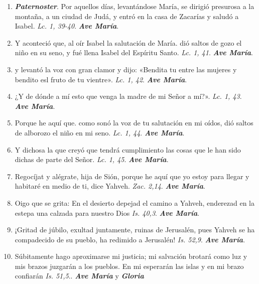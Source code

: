 \documentclass[../../devocionario.tex]{subfiles}
\begin{document}
    \begin{enumerate}
        
        \item \textbf{\textit{Paternoster}}. Por aquellos días, levantándose María, se dirigió presurosa a la montaña, a un ciudad de Judá, 
            y entró en la casa de Zacarías y saludó a Isabel. \textit{Lc. 1, 39-40}. \textbf{\textit{Ave María}}.

        \item Y aconteció que, al oír Isabel la salutación de María. dió saltos de gozo el niño en su seno, 
            y fué llena Isabel del Espíritu Santo. \textit{Lc. 1, 41}. \textbf{\textit{Ave María}}.

        \item y levantó la voz con gran clamor y dijo: «Bendita tu entre las mujeres y bendito esl fruto de tu vientre». \textit{Lc. 1, 42}. \textbf{\textit{Ave María}}.

        \item ¿Y de dónde a mí esto que venga la madre de mi Señor a mí?». \textit{Lc. 1, 43}. \textbf{\textit{Ave María}}.

        \item Porque he aquí que. como sonó la voz de tu salutación en mi oídos, dió saltos de alborozo el niño en mi seno. \textit{Lc. 1, 44}. \textbf{\textit{Ave María}}.

        \item Y dichosa la que creyó que tendrá cumplimiento las cosas que le han sido dichas de parte del Señor. \textit{Lc. 1, 45}. \textbf{\textit{Ave María}}.

        \item Regocíjat y alégrate, hija de Sión, porque he aquí que yo estoy para llegar y habitaré en medio de ti, dice Yahveh. \textit{Zac. 2,14}. \textbf{\textit{Ave María}}.

        \item Oigo que se grita: En el desierto depejad el camino a Yahveh, enderezad en la estepa una calzada para nuestro Dios \textit{Is. 40,3}. \textbf{\textit{Ave María}}.

        \item ¡Gritad de júbilo, exultad juntamente, ruinas de Jerusalén, pues Yahveh se ha compadecido de su pueblo, 
            ha redimido a Jerusalén! \textit{Is. 52,9}. \textbf{\textit{Ave María}}.

        \item Súbitamente hago aproximarse mi justicia; mi salvación brotará como luz y mis brazos juzgarán a los pueblos. 
            En mi esperarán las islas y en mi brazo confiarán \textit{Is. 51,5}.. \textbf{\textit{Ave María}} y \textbf{\textit{Gloria}}

    \end{enumerate}
\end{document}

